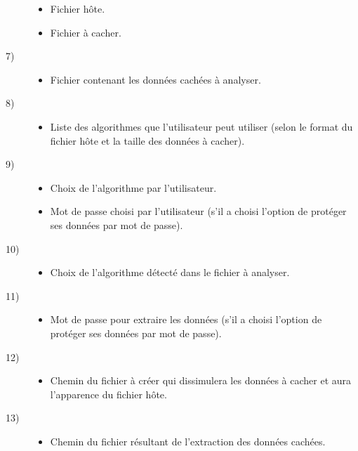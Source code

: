 \documentclass[11pt]{article}
\begin{document}
\begin{multicols}{2}
\begin{description}
\begin{itemize}
\item Fichier hôte.
\item Fichier à cacher.
\end{itemize}
\item[7)]
\begin{itemize}
\item Fichier contenant les données cachées à analyser.
\end{itemize}
\item[8)]
\begin{itemize}
\item Liste des algorithmes que l'utilisateur peut utiliser (selon le format du
    fichier hôte et la taille des données à cacher).
\end{itemize}
\item[9)]
\begin{itemize}
\item Choix de l'algorithme par l'utilisateur.
\item Mot de passe choisi par l'utilisateur (s'il a choisi l'option de protéger
    ses données par mot de passe).
\end{itemize}
\item[10)]
\begin{itemize}
\item Choix de l'algorithme détecté dans le fichier à analyser.
\end{itemize}
\item[11)]
\begin{itemize}
\item Mot de passe pour extraire les données (s'il a choisi l'option de
    protéger ses données par mot de passe).
\end{itemize}
\item[12)]
\begin{itemize}
\item Chemin du fichier à créer qui dissimulera les données à cacher et aura
    l'apparence du fichier hôte.
\end{itemize}
\item[13)]
\begin{itemize}
\item Chemin du fichier résultant de l'extraction des données cachées.
\end{itemize}

\end{description}
\end{multicols}
\end{document}
